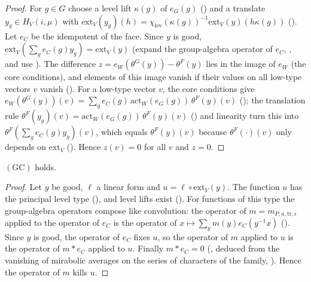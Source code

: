 \begin{proof}
For $g\in G$ choose a level lift $\kappa(g)$ of $e_G(g)$ () and a translate
$y_g\in H_V(i,\mu)$ with $\mathrm{ext}_V(y_g)(h)=\chi_{\mathrm{lev}}(\kappa(g))^{-1}\mathrm{ext}_V(y)(h\kappa(g))$
(). Let $e_C$ be the idempotent of the face. Since $y$ is good,
$\mathrm{ext}_V(\sum_ge_C(g)y_g)=\mathrm{ext}_V(y)$ (expand the group-algebra operator of $e_C$,
, and use ). The difference
$z=e_W(\theta^G(y))-\theta^F(y)$ lies in the image of $e_W$ (the core conditions), and elements of this image vanish if their values
on all low-type vectors $v$ vanish (). For a low-type vector $v$, the core conditions
give $e_W(\theta^G(y))(v)=\sum_ge_C(g)\,\mathrm{act}_W(e_G(g))\,\theta^F(y)(v)$ (); the
translation rule $\theta^F(y_g)(v)=\mathrm{act}_W(e_G(g))\,\theta^F(y)(v)$ () and
linearity turn this into $\theta^F(\sum_ge_C(g)y_g)(v)$, which equals $\theta^F(y)(v)$ because $\theta^F(\cdot)(v)$ only depends on
$\mathrm{ext}_V$ (). Hence $z(v)=0$ for all $v$ and $z=0$.
\end{proof}

\begin{lemma}\label{pf:stageU:goodnochi}
$(\mathrm{GC})$ holds.
\end{lemma}

\begin{proof}
Let $y$ be good, $\ell$ a linear form and $u=\ell\circ\mathrm{ext}_V(y)$. The function $u$ has the principal level type
(), and level lifts exist
(). For functions of this type the group-algebra operators compose like
convolution: the operator of $m=m_{P,a,\mathrm{tr},\epsilon}$ applied to the operator of $e_C$ is the operator of
$x\mapsto\sum_ym(y)e_C(y^{-1}x)$ (). Since $y$ is good, the operator of $e_C$ fixes $u$,
so the operator of $m$ applied to $u$ is the operator of $m\ast e_C$ applied to $u$. Finally $m\ast e_C=0$
(, deduced from the vanishing of mirabolic averages on the series of
characters of the family, ). Hence the operator of $m$ kills $u$.
\end{proof}

